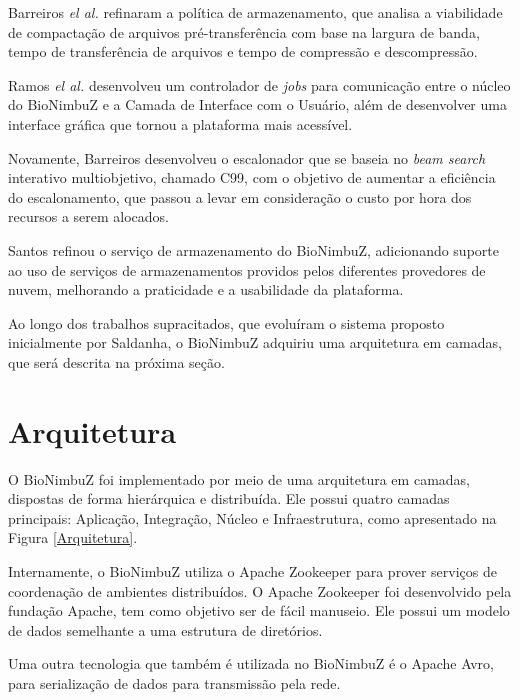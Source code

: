 Barreiros \textit{el al.}\cite{BioNimbuZ_BioCirrus} refinaram a política de armazenamento, que analisa a viabilidade de compactação de arquivos pré-transferência com base na largura de banda, tempo de transferência de arquivos e tempo de compressão e descompressão.

Ramos \textit{el al.}\cite{BioNimbuZ_Ramos} desenvolveu um controlador de \textit{jobs} para comunicação entre o núcleo do BioNimbuZ e a Camada de Interface com o Usuário, além de desenvolver uma interface gráfica que tornou a plataforma mais acessível.

Novamente, Barreiros\cite{BioNimbuZ_Willian_C99} desenvolveu o escalonador que se baseia no \textit{beam search} interativo multiobjetivo, chamado C99, com o objetivo de aumentar a eficiência do escalonamento, que passou a levar em consideração o custo por hora dos recursos a serem alocados.

Santos\cite{BioNimbuZ_Santos} refinou o serviço de armazenamento do BioNimbuZ, adicionando suporte ao uso de serviços de armazenamentos providos pelos diferentes provedores de nuvem, melhorando a praticidade e a usabilidade da plataforma.

Ao longo dos trabalhos supracitados, que evoluíram o sistema proposto inicialmente por Saldanha\cite{Saldanha_BioNimbus}, o BioNimbuZ adquiriu uma arquitetura em camadas, que será descrita na próxima seção.

\section{Arquitetura}
O BioNimbuZ foi implementado por meio de uma arquitetura em camadas, dispostas de forma hierárquica e distribuída. Ele possui quatro camadas principais: Aplicação, Integração, Núcleo e Infraestrutura, como apresentado na Figura \ref{Arquitetura}.

Internamente, o BioNimbuZ utiliza o Apache Zookeeper\cite{Zookeeper} para prover serviços de coordenação de ambientes distribuídos. O Apache Zookeeper foi desenvolvido pela fundação Apache\cite{Apache}, tem como objetivo ser de fácil manuseio. Ele possui um modelo de dados semelhante a uma estrutura de diretórios.

Uma outra tecnologia que também é utilizada no BioNimbuZ é o Apache Avro\cite{Avro}, para serialização de dados para transmissão pela rede.


